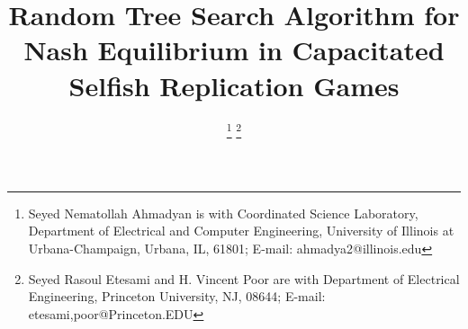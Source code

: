 \documentclass[conference, 10pt, twocolumn]{ieeeconf}
\begin{document}
\title{Random Tree Search Algorithm for Nash Equilibrium in Capacitated Selfish
Replication Games}
\author{
  \authorblockA{}
\thanks{\textdagger Seyed Nematollah Ahmadyan is with
Coordinated Science Laboratory,
Department of Electrical and Computer Engineering,
University of Illinois at Urbana-Champaign, Urbana, IL, 61801;
E-mail: {ahmadya2}@illinois.edu}
\thanks{
\textdaggerdbl Seyed Rasoul Etesami and H. Vincent Poor are with
Department of Electrical Engineering,
Princeton University, NJ, 08644;
E-mail: etesami,poor@Princeton.EDU}
}
\maketitle









\end{document}

